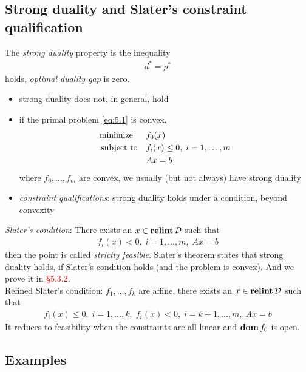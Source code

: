 \subsection{Strong duality and Slater's constraint qualification}
The \textit{strong duality} property is the inequality
\begin{align}
  d^\ast=p^\ast\label{eq:5.24}
\end{align}
holds, \ie \textit{optimal duality gap} is zero.
\begin{itemize}
  \item strong duality does not, in general, hold
  \item if the primal problem \eqref{eq:5.1} is convex, \ie
        \begin{align}
          \text{minimize\;\;}\quad& f_0(x)\nonumber\\
          \text{subject to}  \quad& f_i(x)\le 0,\;i=1,\dots,m\label{eq:5.25}\\
                                  & Ax=b\nonumber
        \end{align}
        where $f_0,\dots,f_m$ are convex, we usually (but not always) have strong duality
  \item \textit{constraint qualifications}: strong duality holds under a condition, beyond convexity
\end{itemize}
\textit{Slater's condition}: There exists an $x\in\mathop{\bf relint}\mathcal{D}$ such that
\begin{align}
  f_i(x)<0,\;i=1,\dots,m,\;Ax=b\label{eq:5.26}
\end{align}
then the point is called \textit{strictly feasible}.
Slater's theorem states that strong duality holds, if Slater's condition holds (and the problem is convex). And we prove it in \textcolor{red}{\S 5.3.2}.\\
Refined Slater's condition: $f_1,\dots,f_k$ are affine, there exists an $x\in\mathop{\bf relint}\mathcal{D}$ such that
\begin{align}
  f_i(x)\le 0,\;i=1,\dots,k,\;f_i(x)<0,\;i=k+1,\dots,m,\;Ax=b\label{eq:5.27}
\end{align}
It reduces to feasibility when the constraints are all linear and $\mathop{\bf dom} f_0$ is open.

\subsection{Examples}
